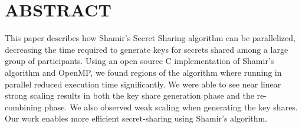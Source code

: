 \documentclass[main.tex]{subfiles}
\begin{document}
\section{ABSTRACT} \label{sec1}

\indent This paper describes how Shamir's Secret Sharing algorithm can be parallelized, decreasing the time required to generate keys for secrets shared among a large group of participants. Using an open source C implementation of Shamir's algorithm and OpenMP, we found regions of the algorithm where running in parallel reduced execution time significantly. We were able to see near linear strong scaling results in both the key share generation phase and the re-combining phase. We also observed weak scaling when generating the key shares. Our work enables more efficient secret-sharing using Shamir's algorithm.
\end{document}
